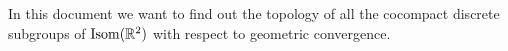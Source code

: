 


In this document we want to find out the topology of all the cocompact discrete subgroups of \(\operatorname{Isom}(\mathbb R^2)\) with respect to geometric convergence. 

